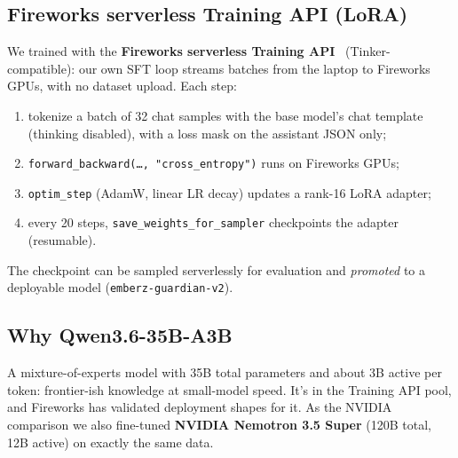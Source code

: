 \documentclass[11pt]{article}
\begin{document}
\subsection{Fireworks serverless Training API (LoRA)}
We trained with the \textbf{Fireworks serverless Training API}~\cite{fwtapi} (Tinker-compatible): our own SFT loop streams batches from the laptop to Fireworks GPUs, with no dataset upload. Each step:
\begin{enumerate}
\item tokenize a batch of 32 chat samples with the base model's chat template (thinking disabled), with a loss mask on the assistant JSON only;
\item \texttt{forward\_backward(\ldots, "cross\_entropy")} runs on Fireworks GPUs;
\item \texttt{optim\_step} (AdamW, linear LR decay) updates a rank-16 LoRA adapter;
\item every 20 steps, \texttt{save\_weights\_for\_sampler} checkpoints the adapter (resumable).
\end{enumerate}
The checkpoint can be sampled serverlessly for evaluation and \emph{promoted} to a deployable model (\texttt{emberz-guardian-v2}).

\subsection{Why Qwen3.6-35B-A3B}
A mixture-of-experts model with 35B total parameters and about 3B active per token: frontier-ish knowledge at small-model speed. It's in the Training API pool, and Fireworks has validated deployment shapes for it. As the NVIDIA comparison we also fine-tuned \textbf{NVIDIA Nemotron 3.5 Super} (120B total, 12B active) on exactly the same data.
\end{document}
